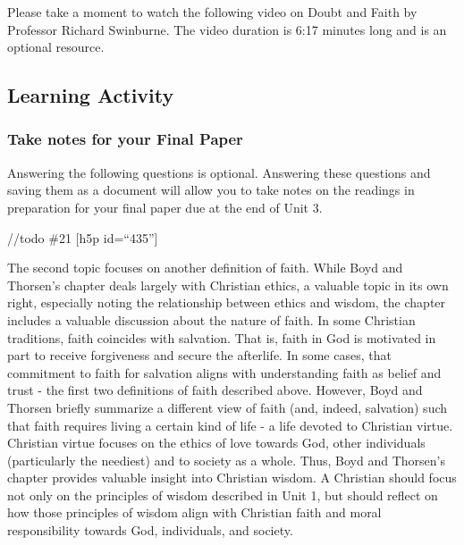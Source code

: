 \documentclass[
]{book}
\begin{document}
Please take a moment to watch the following video on Doubt and Faith by Professor Richard Swinburne. The video duration is 6:17 minutes long and is an optional resource.

\hypertarget{learning-activity-5}{%
\subsection*{Learning Activity}\label{learning-activity-5}}

\begin{reflect}
\hypertarget{take-notes-for-your-final-paper}{%
\subsubsection*{Take notes for your Final Paper}\label{take-notes-for-your-final-paper}}

Answering the following questions is optional. Answering these questions and saving them as a document will allow you to take notes on the readings in preparation for your final paper due at the end of Unit 3.
\end{reflect}
//todo \#21
{[}h5p id=``435''{]}

The second topic focuses on another definition of faith. While Boyd and Thorsen's chapter deals largely with Christian ethics, a valuable topic in its own right, especially noting the relationship between ethics and wisdom, the chapter includes a valuable discussion about the nature of faith. In some Christian traditions, faith coincides with salvation. That is, faith in God is motivated in part to receive forgiveness and secure the afterlife. In some cases, that commitment to faith for salvation aligns with understanding faith as belief and trust - the first two definitions of faith described above. However, Boyd and Thorsen briefly summarize a different view of faith (and, indeed, salvation) such that faith requires living a certain kind of life - a life devoted to Christian virtue. Christian virtue focuses on the ethics of love towards God, other individuals (particularly the neediest) and to society as a whole. Thus, Boyd and Thorsen's chapter provides valuable insight into Christian wisdom. A Christian should focus not only on the principles of wisdom described in Unit 1, but should reflect on how those principles of wisdom align with Christian faith and moral responsibility towards God, individuals, and society.
\end{document}
